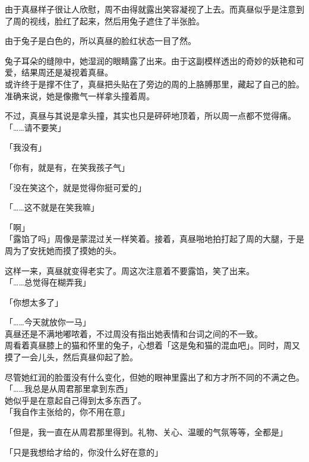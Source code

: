 由于真昼样子很让人欣慰，周不由得就露出笑容凝视了上去。而真昼似乎是注意到了周的视线，脸红了起来，然后用兔子遮住了半张脸。

由于兔子是白色的，所以真昼的脸红状态一目了然。

兔子耳朵的缝隙中，她湿润的眼睛露了出来。由于这副模样透出的奇妙的妖艳和可爱，结果周还是凝视着真昼。\\

或许终于是撑不住了，真昼把头贴在了旁边的周的上胳膊那里，藏起了自己的脸。准确来说，她是像撒气一样拿头撞着周。

不过，真昼与其说是拿头撞，其实也只是砰砰地顶着，所以周一点都不觉得痛。\\

「……请不要笑」

「我没有」

「你有，就是有，在笑我孩子气」

「没在笑这个，就是觉得你挺可爱的」

「……这不就是在笑我嘛」

「啊」\\

「露馅了吗」周像是蒙混过关一样笑着。接着，真昼啪地拍打起了周的大腿，于是周为了安抚她而摸了摸她的头。

这样一来，真昼就变得老实了。周这次注意着不要露馅，笑了出来。\\

「……总觉得在糊弄我」

「你想太多了」

「……今天就放你一马」\\

真昼还是不满地嘟哝着，不过周没有指出她表情和台词之间的不一致。\\

周看着真昼膝上的猫和怀里的兔子，心想着「这是兔和猫的混血吧」。同时，周又摸了一会儿头，然后真昼仰起了脸。

尽管她红润的脸蛋没有什么变化，但她的眼神里露出了和方才所不同的不满之色。\\

「……我总是从周君那里拿到东西」\\

她似乎是在意起自己得到太多东西了。\\

「我自作主张给的，你不用在意」

「但是，我一直在从周君那里得到。礼物、关心、温暖的气氛等等，全都是」

「只是我想给才给的，你没什么好在意的」\\

